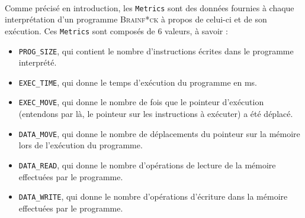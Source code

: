 \documentclass[a4paper]{article}
\begin{document}
\paragraph{}Comme précisé en introduction, les \texttt{Metrics} sont des données fournies à chaque interprétation d'un programme \textsc{Brainf*ck} à propos de celui-ci et de son exécution. Ces \texttt{Metrics} sont composés de 6 valeurs, à savoir :
\begin{itemize}
	\item \texttt{PROG\_SIZE}, qui contient le nombre d'instructions écrites dans le programme interprété.
	\item \texttt{EXEC\_TIME}, qui donne le temps d'exécution du programme en ms.
	\item \texttt{EXEC\_MOVE}, qui donne le nombre de fois que le pointeur d'exécution (entendons par là, le pointeur sur les instructions à exécuter) a été déplacé.
	\item \texttt{DATA\_MOVE}, qui donne le nombre de déplacements du pointeur sur la mémoire lors de l'exécution du programme.
	\item \texttt{DATA\_READ}, qui donne le nombre d'opérations de lecture de la mémoire effectuées par le programme.
	\item \texttt{DATA\_WRITE}, qui donne le nombre d'opérations d'écriture dans la mémoire effectuées par le programme.
\end{itemize}
\end{document}
